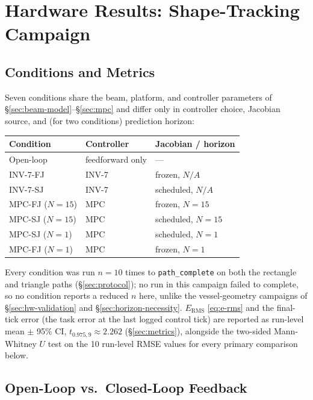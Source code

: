 \documentclass[journal]{IEEEtran}
\begin{document}
\section{Hardware Results: Shape-Tracking Campaign}
\label{sec:shape-results}

\subsection{Conditions and Metrics}
\label{sec:shape-conditions}

Seven conditions share the beam, platform, and controller parameters of
\S\ref{sec:beam-model}--\S\ref{sec:mpc} and differ only in controller
choice, Jacobian source, and (for two conditions) prediction horizon:

\begin{center}
\begin{tabular}{@{}lll@{}}
\toprule
Condition & Controller & Jacobian / horizon \\
\midrule
Open-loop & feedforward only & --- \\
INV-7-FJ & INV-7 & frozen, $N/A$ \\
INV-7-SJ & INV-7 & scheduled, $N/A$ \\
MPC-FJ ($N{=}15$) & MPC & frozen, $N{=}15$ \\
MPC-SJ ($N{=}15$) & MPC & scheduled, $N{=}15$ \\
MPC-SJ ($N{=}1$) & MPC & scheduled, $N{=}1$ \\
MPC-FJ ($N{=}1$) & MPC & frozen, $N{=}1$ \\
\bottomrule
\end{tabular}
\end{center}

Every condition was run $n=10$ times to \texttt{path\_complete} on both
the rectangle and triangle paths (\S\ref{sec:protocol}); no run in this
campaign failed to complete, so no condition reports a reduced $n$ here,
unlike the vessel-geometry campaigns of \S\ref{sec:hw-validation} and
\S\ref{sec:horizon-necessity}. $E_{\mathrm{RMS}}$ \eqref{eq:e-rms} and the
final-tick error (the task error at the last logged control tick) are
reported as run-level mean $\pm$ 95\% CI, $t_{0.975,9}\approx2.262$
(\S\ref{sec:metrics}), alongside the two-sided Mann-Whitney $U$ test on
the 10 run-level RMSE values for every primary comparison below.

\subsection{Open-Loop vs.\ Closed-Loop Feedback}
\label{sec:shape-exp1}
\end{document}
